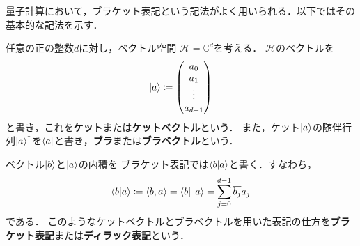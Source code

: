 量子計算において，ブラケット表記という記法がよく用いられる．以下ではその基本的な記法を示す．

\begin{defi}
  任意の正の整数$d$に対し，ベクトル空間
  $\mathcal H=\mathbb C^d$を考える．
  $\mathcal H$のベクトルを
  \begin{equation*}
    \ket{a}
    \coloneq
    \begin{pmatrix}
      a_0 \\a_1\\\vdots\\a_{d-1}
    \end{pmatrix}
  \end{equation*}
  と書き，これを\textbf{ケット}または\textbf{ケットベクトル}という．
  また，ケット$\ket{a}$の随伴行列$\ket{a}^{\dagger}$を$\bra{a}$と書き，\textbf{ブラ}または\textbf{ブラベクトル}という．

  ベクトル$\ket{b}$と$\ket{a}$の内積を
  ブラケット表記では$\braket{b|a}$と書く．すなわち，
  \begin{equation*}
    \braket{b|a}\coloneq\langle b,a\rangle
    =\bra{b}\ket{a}
    =\sum_{j=0}^{d-1}\overline{b_j}a_j
  \end{equation*}
  である．
  このようなケットベクトルとブラベクトルを用いた表記の仕方を\textbf{ブラケット表記}または\textbf{ディラック表記}という．
\end{defi}
